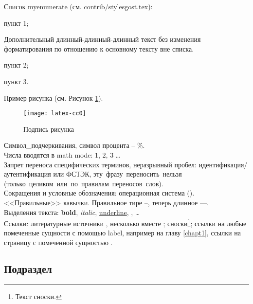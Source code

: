 Список myenumerate (см. contrib/stylesgost.tex):
\begin{myenumerate}
\item пункт 1;

  Дополнительный длинный-длинный-длинный текст без изменения
  форматирования по отношению к основному тексту вне списка.

\item пункт 2;
\item пункт 3. \\
\end{myenumerate}

Пример рисунка (см. Рисунок \ref{test1}). \\

\begin{figure}[bhtp]
  \centering \texttt{[image: latex-cc0]}
  \caption{Подпись рисунка} \label{test1}
\end{figure}

Символ\_подчеркивания, символ процента -- \%. \\

Числа вводятся в math mode: $1$, $2$, $3$ \dots{} \\

Запрет переноса специфических терминов, неразрывный пробел:
\mbox{идентификация/аутентификация} или \mbox{ФСТЭК},
эту~фразу~переносить~нельзя
(только~целиком~или~по~правилам~переносов~слов). \\

Сокращения и условные обозначения: операционная система
(). \\

<<Правильные>> кавычки. Правильное тире --, теперь длинное ---. \\

Выделения текста: \textbf{bold}, \textit{italic},
\underline{underline}, , \dots{} \\

Ссылки: литературные источники \cite{article_other}, несколько вместе
\cite{article_pub, article_vak, article_scopus}; сноски\footnote{Текст
  сноски.}; ссылки на любые помеченные сущности с помощью label,
например на главу \ref{chapt1}, ссылки на страницу с помеченной
сущностью \pageref{chapt1}. \\

\subsection{Подраздел} \label{subsect1_1_1}

